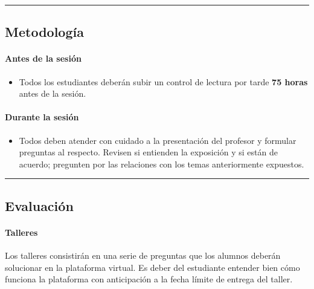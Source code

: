\documentclass[spanish,]{article}
\providecommand{\tightlist}{%
  \setlength{\itemsep}{0pt}\setlength{\parskip}{0pt}}
\let\oldparagraph\paragraph
\renewcommand{\paragraph}[1]{\oldparagraph{#1}\mbox{}}
\begin{document}
\begin{center}\rule{0.5\linewidth}{\linethickness}\end{center}

\subsection{Metodología}\label{metodologia}

\paragraph{\texorpdfstring{\textbf{Antes de la
sesión}}{Antes de la sesión}}\label{antes-de-la-sesion}

\begin{itemize}
\tightlist
\item
  Todos los estudiantes deberán subir un control de lectura por tarde
  \textbf{75 horas} antes de la sesión.
\end{itemize}

\paragraph{\texorpdfstring{\textbf{Durante la
sesión}}{Durante la sesión}}\label{durante-la-sesion}

\begin{itemize}
\tightlist
\item
  Todos deben atender con cuidado a la presentación del profesor y
  formular preguntas al respecto. Revisen si entienden la exposición y
  si están de acuerdo; pregunten por las relaciones con los temas
  anteriormente expuestos.
\end{itemize}

\begin{center}\rule{0.5\linewidth}{\linethickness}\end{center}


\subsection{Evaluación}\label{evaluacion}

\paragraph{\texorpdfstring{\textbf{Talleres}}{Talleres}}\label{talleres}

Los talleres consistirán en una serie de preguntas que los alumnos
deberán solucionar en la plataforma virtual. Es deber del estudiante
entender bien cómo funciona la plataforma con anticipación a la fecha
límite de entrega del taller.
\end{document}

